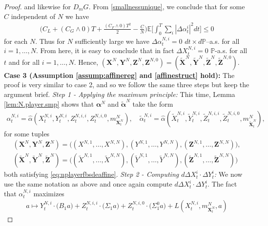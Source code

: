 \documentclass[11pt,reqno]{amsart}
\numberwithin{equation}{section}
\theoremstyle{definition}
\def\E{{\mathbb E}}
\def\P{{\mathcal P}}
\newcommand{\bX}{\mathbf{X}}
\newcommand{\bY}{\mathbf{Y}}
\newcommand{\bZ}{\mathbf{Z}}
\newcommand{\wt}{\widetilde}
\def \E{\mathbb{E}}
\def \P{\mathbb{P}}
\begin{document}
\begin{proof}
and likewise for $D_m G$.
From \eqref{smallnessunique}, we conclude that for some $C$ independent of $N$ we have 
\begin{align*}
  \Big(C_L + (C_{G} \wedge 0) T + \frac{(C_{F} \wedge 0) T^2}{2} - \frac{C}{N}\Big) \E \bigg[ \int_0^T \sum_i |\Delta \alpha_t^i|^2 dt \bigg] \leq 0
\end{align*}
for each $N$. 
Thus for $N$ sufficiently large we have $\Delta \alpha_t^{N,i} = 0$ $dt\times d\P$--a.s. for all $i = 1,\dots, N$.
From here, it is easy to conclude that in fact $\Delta X_t^{N,i} = 0$ $\P$-a.s. for all $t$ and for all $i=1,\dots,N$.
Hence, $(\bX^N, \bY^N, \bZ^N, \bZ^{N,0}) = (\wt{\bX}^N, \wt{\bY}^N, \wt{\bZ}^N, \wt{\bZ}^{N,0})$. 
\newline \newline \noindent 
\textbf{Case 3 (Assumption \ref{assump:affinereg} and \ref{affinestruct} hold):} The proof is very similar to case 2, and so we follow the same three steps but keep the argument brief. 
\newline \noindent 
\textit{Step 1 - Applying the maximum principle:} This time, Lemma \ref{lem:N.player.smp} shows that $\bm \alpha^N$ and $\wt{\bm \alpha}^N$ take the form 
\begin{align*}
    \alpha_t^{N,i} = \widehat{\alpha}(X_t^{N,i}, Y_t^{N,i}, Z_t^{N,i,i}, Z_t^{N,i,0},m^N_{\bm X^N_t}), \quad \wt{\alpha}_t^{N,i} = \widehat{\alpha}(\wt{X}_t^{N,i}, \wt{Y}_t^{N,i}, \wt{Z}_t^{N,i,i}, \wt{Z}_t^{N,i,0},m^N_{\wt{\bm X}^N_t}) ,
\end{align*}
for some tuples 
\begin{align*}
(\bX^N, \bY^N, \bZ^N) = \big( (X^{N,1},\dots,X^{N,N}), (Y^{N,1},\dots,Y^{N,N}), (\bZ^{N,1},\dots,\bZ^{N,N})\big), \\
(\bm{\wt{X}}^N, \bm{\wt{Y}}^N, \bm{\wt{Z}}^N) = \big( (\wt{X}^{N,1},\dots,\wt{X}^{N,N}), (\wt{Y}^{N,1},\dots,\wt{Y}^{N,N}), (\bm{\wt{Z}}^{N,1},\dots,\bm{\wt{Z}}^{N,N})\big)
\end{align*} 
both satisfying \eqref{eq:nplayerfbsdeaffine}. 
\newline 
\noindent \textit{Step 2 - Computing $d \Delta X_t^i \cdot \Delta Y_t^i$:} We now use the same notation as above and once again compute $d \Delta X_t^i \cdot \Delta Y_t^i$. 
The fact that $\alpha_t^{N,i}$ maximizes 
\begin{align*}
    a \mapsto Y_t^{N,i} \cdot \big( B_1 a \big) + Z_t^{N,i,i} \cdot \big(\Sigma_1 a \big) + Z_t^{N,i,0} \cdot \big( \Sigma_1^0 a \big) + L(X_t^{N,i}, m_{\bX_t^N}^N, a)
\end{align*}

\end{proof}
\end{document}

